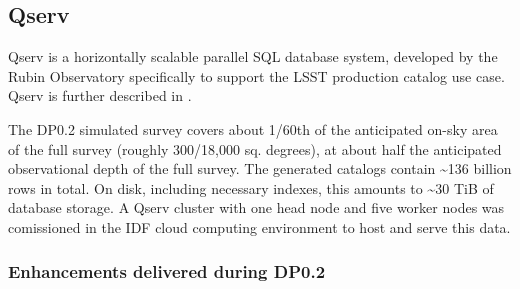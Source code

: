 \subsection{Qserv}\label{sec:qserv}

Qserv is a horizontally scalable parallel SQL database system, developed by the Rubin Observatory specifically
to support the LSST production catalog use case.  Qserv is further described in .

The DP0.2 simulated survey covers about 1/60th of the anticipated on-sky area of the full survey (roughly
300/18,000 sq. degrees), at about half the anticipated observational depth of the full survey.  The generated
catalogs contain \textasciitilde{}136 billion rows in total.  On disk, including necessary indexes, this
amounts to \textasciitilde{}30 TiB of database storage.  A Qserv cluster with one head node and five worker
nodes was comissioned in the IDF cloud computing environment to host and serve this data.

\subsubsection{Enhancements delivered during DP0.2}

